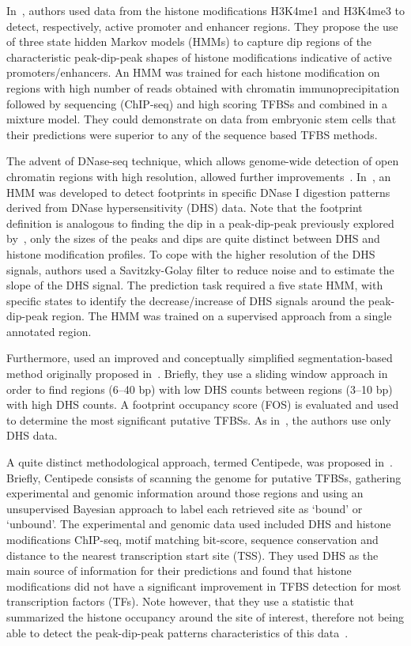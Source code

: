 \documentclass{bioinfo}
\begin{document}
In~\cite{won2010}, authors used data from the histone modifications
H3K4me1 and H3K4me3 to detect, respectively, active promoter and
enhancer regions. They propose the use of three state hidden Markov
models (HMMs) to capture dip regions of the characteristic peak-dip-peak
shapes of histone modifications indicative of active {\color{black} promoters}/enhancers. 
An HMM was trained for each histone modification on regions with
high number of reads obtained with chromatin immunoprecipitation followed
by sequencing (ChIP-seq) and high scoring TFBSs and combined in a
mixture model. They could demonstrate on data from embryonic stem cells that
their predictions were superior to any of the sequence based TFBS methods.

The advent of DNase-seq technique, which allows genome-wide detection
of open chromatin regions with high resolution, allowed further
improvements~\citep{boyle2011,pique2011}. In~\cite{boyle2011}, an HMM
was developed to detect footprints in specific DNase I digestion
patterns derived from DNase hypersensitivity (DHS) data. Note that the
footprint definition is analogous to finding the dip in a peak-dip-peak
previously explored by~\cite{won2010}, only the sizes of the peaks
and dips are quite distinct between DHS and histone modification
profiles. To cope with the higher resolution of the DHS signals,
authors used a Savitzky-Golay filter to reduce noise and to estimate the
slope of the DHS signal. The prediction task required a five state
HMM, with specific states to identify the decrease/increase of DHS
signals around the peak-dip-peak region. The HMM was trained on a
supervised approach from a single annotated region.

Furthermore, \cite{neph2012a} used an improved and conceptually simplified
segmentation-based method originally proposed in~\cite{hesselberth2009}.
Briefly, they use a sliding window approach in order to find regions
(6--40 bp) with low DHS counts between regions (3--10 bp) with high
DHS counts. A footprint occupancy score (FOS) is evaluated and used
to determine the most significant putative TFBSs. As in~\cite{boyle2011},
the authors use only DHS data.

A quite distinct methodological approach, termed Centipede, was
proposed in~\cite{pique2011}. Briefly, Centipede consists of scanning
the genome for putative TFBSs, gathering experimental and
genomic information around those regions and using an unsupervised
Bayesian approach to label each retrieved site as `bound' or
`unbound'. The experimental and genomic data used included
DHS and histone modifications ChIP-seq, motif matching
bit-score, sequence conservation and distance to the nearest 
transcription start site (TSS). They used DHS as the main source
of information for their predictions and found that histone
modifications did not have a significant improvement in TFBS detection
for most transcription factors (TFs). Note however, that they use a
statistic that summarized the histone occupancy around the
site of interest, therefore not being able to detect the peak-dip-peak
patterns characteristics of this data~\citep{won2010}.
\end{document}
